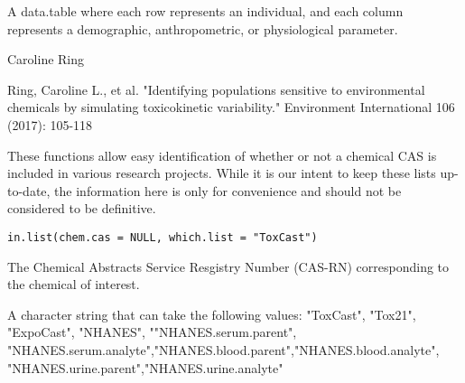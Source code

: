 \documentclass[a4paper]{book}
\begin{document}
%
\begin{Value}
A data.table where each row represents an individual, and
each column represents a demographic, anthropometric, or physiological
parameter.
\end{Value}
%
\begin{Author}\relax
Caroline Ring
\end{Author}
%
\begin{References}\relax
Ring, Caroline L., et al. "Identifying populations sensitive to 
environmental chemicals by simulating toxicokinetic variability." Environment 
International 106 (2017): 105-118
\end{References}
%
\begin{Description}\relax
These functions allow easy identification of whether or not a chemical CAS
is included in various research projects. While it is our intent to keep
these lists up-to-date, the information here is only for convenience and
should not be considered to be definitive.
\end{Description}
%
\begin{Usage}
\begin{verbatim}
in.list(chem.cas = NULL, which.list = "ToxCast")
\end{verbatim}
\end{Usage}
%
\begin{Arguments}
\begin{ldescription}
\item[\code{chem.cas}] The Chemical Abstracts Service Resgistry Number (CAS-RN)
corresponding to the chemical of interest.

\item[\code{which.list}] A character string that can take the following values:
"ToxCast", "Tox21", "ExpoCast", "NHANES", ""NHANES.serum.parent",
"NHANES.serum.analyte","NHANES.blood.parent","NHANES.blood.analyte",
"NHANES.urine.parent","NHANES.urine.analyte"
\end{ldescription}
\end{Arguments}
\end{document}
